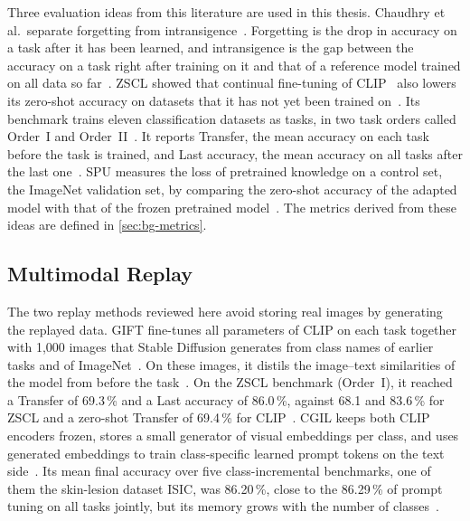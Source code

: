 Three evaluation ideas from this literature are used in this thesis.
Chaudhry et al.\ separate forgetting from intransigence~\cite{Chaudhry_2018}.
Forgetting is the drop in accuracy on a task after it has been learned, and intransigence is the gap between the accuracy on a task right after training on it and that of a reference model trained on all data so far~\cite{Chaudhry_2018}.
ZSCL showed that continual fine-tuning of CLIP~\cite{radford2021learningtransferablevisualmodels} also lowers its zero-shot accuracy on datasets that it has not yet been trained on~\cite{zheng2023preventingzeroshottransferdegradation}.
Its benchmark trains eleven classification datasets as tasks, in two task orders called Order~I and Order~II~\cite{zheng2023preventingzeroshottransferdegradation}.
It reports Transfer, the mean accuracy on each task before the task is trained, and Last accuracy, the mean accuracy on all tasks after the last one~\cite{zheng2023preventingzeroshottransferdegradation}.
SPU measures the loss of pretrained knowledge on a control set, the ImageNet validation set, by comparing the zero-shot accuracy of the adapted model with that of the frozen pretrained model~\cite{Zhang_2024_CVPR}.
The metrics derived from these ideas are defined in \cref{sec:bg-metrics}.

\subsection{Multimodal Replay}

The two replay methods reviewed here avoid storing real images by generating the replayed data.
GIFT fine-tunes all parameters of CLIP on each task together with 1{,}000 images that Stable Diffusion generates from class names of earlier tasks and of ImageNet~\cite{wu2024gift}.
On these images, it distils the image--text similarities of the model from before the task~\cite{wu2024gift}.
On the ZSCL benchmark (Order~I), it reached a Transfer of 69.3\,\% and a Last accuracy of 86.0\,\%, against 68.1 and 83.6\,\% for ZSCL and a zero-shot Transfer of 69.4\,\% for CLIP~\cite{wu2024gift}.
CGIL keeps both CLIP encoders frozen, stores a small generator of visual embeddings per class, and uses generated embeddings to train class-specific learned prompt tokens on the text side~\cite{frascaroli2024clipgenerativelatentreplay}.
Its mean final accuracy over five class-incremental benchmarks, one of them the skin-lesion dataset ISIC, was 86.20\,\%, close to the 86.29\,\% of prompt tuning on all tasks jointly, but its memory grows with the number of classes~\cite{frascaroli2024clipgenerativelatentreplay}.

